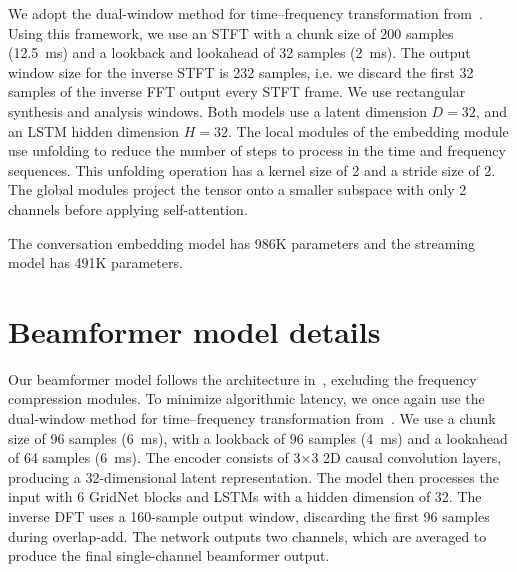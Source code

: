 We adopt the dual-window method for time–frequency transformation from~\cite{low_latency_stft}. Using this framework, we use an STFT with a chunk size of 200 samples (12.5~ms) and a lookback and lookahead of 32 samples (2~ms). The output window size for the inverse STFT is 232 samples, i.e. we discard the first 32 samples of the inverse FFT output every STFT frame. We use rectangular synthesis and analysis windows. Both models use a latent dimension $D=32$, and an LSTM hidden dimension $H=32$. The local modules of the embedding module use unfolding to reduce the number of steps to process in the time and frequency sequences. This unfolding operation has a kernel size of 2 and a stride size of 2. The global modules project the tensor onto a smaller subspace with only 2 channels before applying self-attention.

The  conversation embedding model has 986K parameters and the streaming model has 491K parameters.

\section{Beamformer model   details}\label{sec:beamformerdetails}

Our beamformer model follows the architecture in~\cite{soundbubble}, excluding the frequency compression modules. To minimize algorithmic latency, we once again use the dual-window method for time–frequency transformation from~\cite{low_latency_stft}. We use a chunk size of 96 samples (6~ms), with a lookback of 96 samples (4~ms) and a lookahead of 64 samples (6~ms). The encoder consists of 3×3 2D causal convolution layers, producing a 32-dimensional latent representation. The model then processes the input with 6 GridNet blocks and LSTMs with a hidden dimension of 32. The inverse DFT uses a 160-sample output window, discarding the first 96 samples during overlap-add. The network outputs two channels, which are averaged to produce the final single-channel beamformer output.


